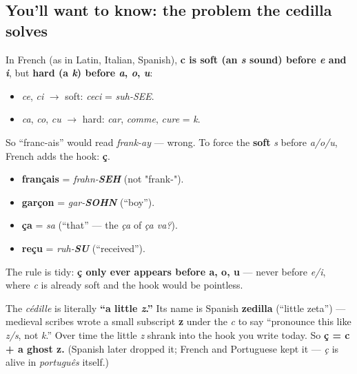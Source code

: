 \subsection*{You'll want to know: the problem the cedilla solves}
In French (as in Latin, Italian, Spanish), \textbf{c is soft (an \emph{s} sound) before \emph{e} and \emph{i}}, but \textbf{hard (a \emph{k}) before \emph{a}, \emph{o}, \emph{u}}:

\begin{itemize}
\raggedright
  \item \emph{ce}, \emph{ci} $\to$ soft: \emph{ceci} = \emph{suh-SEE}.
  \item \emph{ca}, \emph{co}, \emph{cu} $\to$ hard: \emph{car}, \emph{comme}, \emph{cure} = \emph{k}.
\end{itemize}

So \textquotedblleft{}franc-ais\textquotedblright{} would read \emph{frank-ay} — wrong. To force the \textbf{soft} \emph{s} before \emph{a/o/u}, French adds the hook: \textbf{ç}.

\begin{itemize}
\raggedright
  \item \textbf{français} = \emph{frahn-\textbf{SEH}} (not "frank-").
  \item \textbf{garçon} = \emph{gar-\textbf{SOHN}} (\textquotedblleft{}boy\textquotedblright{}).
  \item \textbf{ça} = \emph{sa} (\textquotedblleft{}that\textquotedblright{} — the \emph{ça} of \emph{ça va?}).
  \item \textbf{reçu} = \emph{ruh-\textbf{SU}} (\textquotedblleft{}received\textquotedblright{}).
\end{itemize}

The rule is tidy: \textbf{ç only ever appears before a, o, u} — never before \emph{e/i}, where \emph{c} is already soft and the hook would be pointless.

\begin{cousinweb}
The \emph{cédille} is literally \textbf{\textquotedblleft{}a little \emph{z}.\textquotedblright{}} Its name is Spanish \textbf{zedilla} (\textquotedblleft{}little zeta\textquotedblright{}) — medieval scribes wrote a small subscript \textbf{z} under the \emph{c} to say \textquotedblleft{}pronounce this like \emph{z/s}, not \emph{k}.\textquotedblright{} Over time the little \emph{z} shrank into the hook you write today. So \textbf{ç = c + a ghost z.} (Spanish later dropped it; French and Portuguese kept it — \emph{ç} is alive in \emph{português} itself.)
\end{cousinweb}

